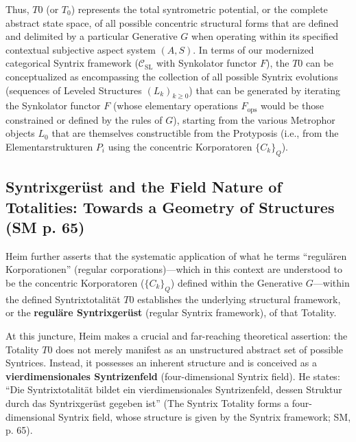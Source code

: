 \documentclass[
    12pt,              %
    a4paper,           %
    headings=normal,   %
    twoside=true,      %
    BCOR=8mm,          %
]{scrbook}
\newcommand{\q}[1]{\enquote{#1}}
\newcommand{\subjektiveraspekt}{S}
\newcommand{\syntrixtotalitaet}{T0}
\newcommand{\generative}{G}
\newcommand{\fops}{F_{\text{ops}}}
\begin{document}
Thus, \(\syntrixtotalitaet\) (or \(T_0\)) represents the total syntrometric potential, or the complete abstract state space, of all possible concentric structural forms that are defined and delimited by a particular Generative \(\generative\) when operating within its specified contextual subjective aspect system \((A,\subjektiveraspekt)\). In terms of our modernized categorical Syntrix framework (\(\mathcal{C}_{\text{SL}}\) with Synkolator functor \(F\)), the \(\syntrixtotalitaet\) can be conceptualized as encompassing the collection of all possible Syntrix evolutions (sequences of Leveled Structures \( (L_k)_{k \ge 0} \)) that can be generated by iterating the Synkolator functor \(F\) (whose elementary operations \(\fops\) would be those constrained or defined by the rules of \(\generative\)), starting from the various Metrophor objects \(L_0\) that are themselves constructible from the Protyposis (i.e., from the Elementarstrukturen \(P_i\) using the concentric Korporatoren \(\{C_k\}_Q\)).

\subsection{Syntrixgerüst and the Field Nature of Totalities: Towards a Geometry of Structures (SM p. 65)}
\label{sec:ch4_syntrixgeruest_field_nature_revised} 

Heim further asserts that the systematic application of what he terms \q{regulären Korporationen} (regular corporations)—which in this context are understood to be the concentric Korporatoren (\(\{C_k\}_Q\)) defined within the Generative \(\generative\)—within the defined Syntrixtotalität \(\syntrixtotalitaet\) establishes the underlying structural framework, or the \textbf{reguläre Syntrixgerüst} (regular Syntrix framework), of that Totality.

At this juncture, Heim makes a crucial and far-reaching theoretical assertion: the Totality \(\syntrixtotalitaet\) does not merely manifest as an unstructured abstract set of possible Syntrices. Instead, it possesses an inherent structure and is conceived as a \textbf{vierdimensionales Syntrizenfeld} (four-dimensional Syntrix field). He states: \q{Die Syntrixtotalität bildet ein vierdimensionales Syntrizenfeld, dessen Struktur durch das Syntrixgerüst gegeben ist} (The Syntrix Totality forms a four-dimensional Syntrix field, whose structure is given by the Syntrix framework; SM, p. 65).
\end{document}
